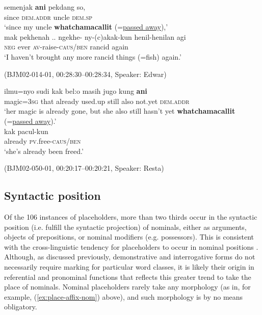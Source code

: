 \documentclass[output=paper,colorlinks,citecolor=brown
\ChapterDOI{10.5281/zenodo.15697585}
]{langscibook}
\begin{document}
\begin{exe}
    \ex\label{ex:place-unrepair-taboo} \begin{xlist}[0\quad →A:]
         \gll
        semenjak \textbf{ani} pekdang so, \\
        since \textsc{dem.addr} uncle \textsc{dem.sp} \\
        \glt `since my uncle \textbf{whatchamacallit} (=\uline{passed away}),' \\
        \exi{2\quad \hphantom{→E:}} \gll
        mak pekhenah .. ngekhe- ny-(c)akak-kun henil-henilan agi \\
        \textsc{neg} ever {} {} \textsc{av}-raise-\textsc{caus/ben} rancid again \\
        \glt `I haven't brought any more rancid things (=fish) again.' \\
    \end{xlist}
    \hfill (BJM02-014-01, 00:28:30–00:28:34, Speaker: Edwar) 
\end{exe}

\begin{exe}
    \ex\label{ex:place-unrepair-taboo2} \begin{xlist}[0\quad →A:]
         \gll
        ilmu=nyo sudi kak bel:o masih jugo kung \textbf{ani} \\
        magic=3\textsc{sg} that already used.up still also not.yet \textsc{dem.addr} \\
        \glt `her magic is already gone, but she also still hasn't yet \textbf{whatchamacallit} (=\uline{passed away}).' \\
        \exi{2\quad \hphantom{→R:}} \gll
        kak pacul-kun \\
        already \textsc{pv}.free-\textsc{caus/ben} \\
        \glt `she's already been freed.' \\
    \end{xlist}
    \hfill (BJM02-050-01, 00:20:17–00:20:21, Speaker: Resta) 
\end{exe}

\subsection{Syntactic position}

Of the 106 instances of placeholders, more than two thirds occur in the syntactic position (i.e. fulfill the syntactic projection) of nominals, either as arguments, objects of prepositions, or nominal modifiers (e.g. possessors). This is consistent with the cross-linguistic tendency for placeholders to occur in nominal positions \citep{podlesskaya2010parameters}. Although, as discussed previously, demonstrative and interrogative forms do not necessarily require marking for particular word classes, it is likely their origin in referential and pronominal functions that reflects this greater trend to take the place of nominals. Nominal placeholders rarely take any morphology (as in, for example, (\ref{ex:place-affix-nom}) above), and such morphology is by no means obligatory.
\end{document}
